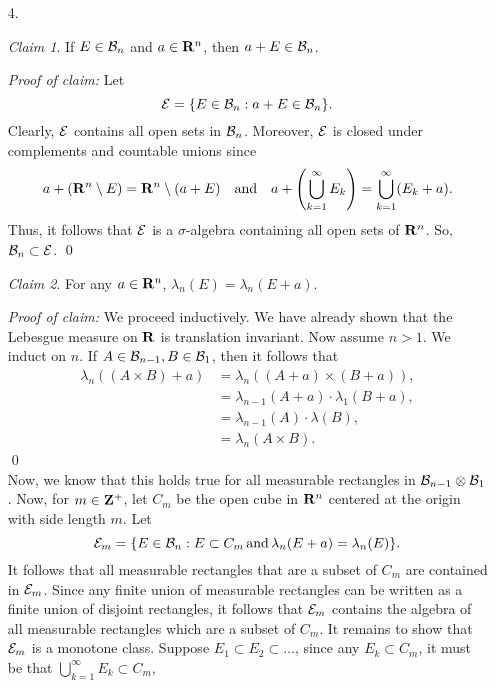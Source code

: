 \documentclass{article}
\theoremstyle{remark}
\newtheorem{claim}{Claim}
\newenvironment{poc}{\textit{Proof of claim:}}{\qed\\}
\begin{document}
\thispagestyle{firstpage}
\begin{enumerate}[leftmargin=*]
    \item[4.] \begin{claim}
        If $E \in \mathcal{B}_n$ and $a \in \mathbf{R}^n$, then $a + E \in \mathcal{B}_n$. 
    \end{claim}
    \begin{poc}
        Let 
        \[
            \mathcal{E} = \{E \in \mathcal{B}_n : a + E \in \mathcal{B}_n\}.
        \]
        Clearly, $\mathcal{E}$ contains all open sets in $\mathcal{B}_n$. Moreover, $\mathcal{E}$ is closed under complements and countable unions since 
        \[
            a + (\mathbf{R}^n \setminus E) = \mathbf{R}^n \setminus (a + E) \quad \text{and} \quad a + \left(\bigcup_{k=1}^\infty E_k \right) = \bigcup_{k=1}^\infty (E_k + a).
        \]
        Thus, it follows that $\mathcal{E}$ is a $\sigma$-algebra containing all open sets of $\mathbf{R}^n$. 
        So, $\mathcal{B}_n \subset \mathcal{E}$. 
    \end{poc}
    \begin{claim}
        For any $a \in \mathbf{R}^n$, $\lambda_n(E) = \lambda_n(E+ a)$.
    \end{claim}
    \begin{poc}
        We proceed inductively. We have already shown that the Lebesgue measure on $\mathbf{R}$ is translation invariant. Now assume $n > 1$. We induct on $n$. If $A \in \mathcal{B}_{n-1}, B \in \mathcal{B}_1$, then it follows that 
        \begin{align*}
            \lambda_n((A \times B) + a) &= \lambda_{n}((A + a) \times (B + a)), \\
            &= \lambda_{n-1}(A + a) \cdot \lambda_1 (B + a), \\
            &= \lambda_{n-1}(A) \cdot \lambda(B), \\
            &= \lambda_n (A \times B).
        \end{align*}
    \end{poc}
    Now, we know that this holds true for all measurable rectangles in $\mathcal{B}_{n-1}\otimes \mathcal{B}_1$. Now, for $m\in\mathbf{Z}^+$, let $C_m$ be the open cube in $\mathbf{R}^n$ centered at the origin with side length $m$. Let \[
        \mathcal{E}_m = \{E \in \mathcal{B}_n : E \subset C_m\,\text{and}\,\lambda_n(E + a) = \lambda_n(E)\}.
    \]
    It follows that all measurable rectangles that are a subset of $C_m$ are contained in $\mathcal{E}_m$. Since any finite union of measurable rectangles can be written as a finite union of disjoint rectangles, it follows that $\mathcal{E}_m$ contains the algebra of all measurable rectangles which are a subset of $C_m$. It remains to show that $\mathcal{E}_m$ is a monotone class. Suppose $E_1 \subset E_2 \subset \ldots$, since any $E_k \subset C_m$, it must be that $\bigcup_{k=1}^\infty E_k \subset C_m$,

\end{enumerate}
\end{document}
